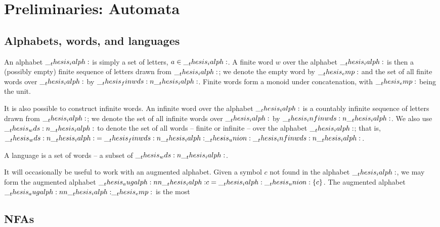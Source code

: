 \chapter{Preliminaries: Automata}\label{ch:automata}

\section{Alphabets, words, and languages}

An alphabet $\__thesis_ialph:$ is simply a set of letters, $a \in \__thesis_ialph:$.
A finite word $w$ over the alphabet $\__thesis_ialph:$ is then a (possibly empty) finite sequence of letters drawn from $\__thesis_ialph:$;
we denote the empty word by $\__thesis_emp:$ and the set of all finite words over $\__thesis_ialph:$ by $\__thesis_finwds:n {\__thesis_ialph:}$.
Finite words form a monoid under concatenation, with $\__thesis_emp:$ being the unit.

It is also possible to construct infinite words.
An infinite word over the alphabet $\__thesis_ialph:$ is a countably infinite sequence of letters drawn from $\__thesis_ialph:$;
we denote the set of all infinite words over $\__thesis_ialph:$ by $\__thesis_infinwds:n {\__thesis_ialph:}$.
We also use $\__thesis_wds:n {\__thesis_ialph:}$ to denote the set of all words -- finite or infinite -- over the alphabet $\__thesis_ialph:$; that is, $\__thesis_wds:n {\__thesis_ialph:} = \__thesis_finwds:n {\__thesis_ialph:} \__thesis_union: \__thesis_infinwds:n {\__thesis_ialph:}$.

A language is a set of words  -- a subset of $\__thesis_wds:n {\__thesis_ialph:}$.

It will occasionally be useful to work with an augmented alphabet.
Given a symbol $c$ not found in the alphabet $\__thesis_ialph:$, we may form the augmented alphabet $\__thesis_augalph:nn {\__thesis_ialph:} {c} = \__thesis_ialph: \__thesis_union: \{c\}$.
The augmented alphabet $\__thesis_augalph:nn {\__thesis_ialph:} {\__thesis_emp:}$ is the most

\section{\Aclp*{NFA}}

